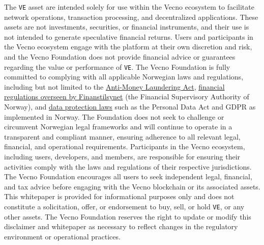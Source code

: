 \documentclass[a4paper,onecolumn,superscriptaddress,10pt]{compositionalityarticle}
\begin{document}
The \texttt{VE} asset are intended solely for use within the Vecno ecosystem to facilitate network operations, transaction processing, and decentralized applications. These assets are not investments, securities, or financial instruments, and their use is not intended to generate speculative financial returns. Users and participants in the Vecno ecosystem engage with the platform at their own discretion and risk, and the Vecno Foundation does not provide financial advice or guarantees regarding the value or performance of \texttt{VE}. The Vecno Foundation is fully committed to complying with all applicable Norwegian laws and regulations, including but not limited to the \href{https://lovdata.no/dokument/NLE/lov/2018-06-01-23}{Anti-Money Laundering Act}, \href{https://www.finanstilsynet.no/en/laws-and-regulations/}{financial regulations overseen by Finanstilsynet} (the Financial Supervisory Authority of Norway), and \href{https://lovdata.no/dokument/NLE/lov/2018-06-15-38}{data protection laws} such as the Personal Data Act and GDPR as implemented in Norway. The Foundation does not seek to challenge or circumvent Norwegian legal frameworks and will continue to operate in a transparent and compliant manner, ensuring adherence to all relevant legal, financial, and operational requirements. Participants in the Vecno ecosystem, including users, developers, and members, are responsible for ensuring their activities comply with the laws and regulations of their respective jurisdictions. The Vecno Foundation encourages all users to seek independent legal, financial, and tax advice before engaging with the Vecno blockchain or its associated assets. This whitepaper is provided for informational purposes only and does not constitute a solicitation, offer, or endorsement to buy, sell, or hold \texttt{VE}, or any other assets. The Vecno Foundation reserves the right to update or modify this disclaimer and whitepaper as necessary to reflect changes in the regulatory environment or operational practices.


\onecolumn
\end{document}
